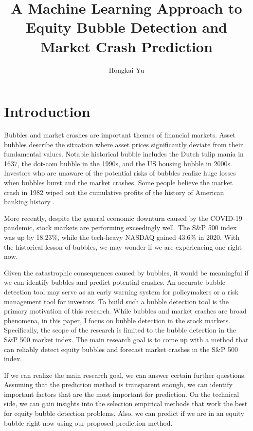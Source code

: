 \documentclass[12pt, man, a4paper, floatsintext]{apa7}
\title{A Machine Learning Approach to Equity Bubble Detection and Market Crash Prediction}
\author{Hongkai Yu}
\affiliation{Vancouver School of Economics, University of British Columbia
          \\ ECON 490
          \\ Dr. Jonathan Graves
          \\ April 23, 2021}
\begin{document}
    \linespread{1} %

    \maketitle

    \section{Introduction}

Bubbles and market crashes are important themes of financial markets. Asset bubbles describe the situation where asset prices significantly deviate from their fundamental values. Notable historical bubble includes the Dutch tulip mania in 1637, the dot-com bubble in the 1990s, and the US housing bubble in 2000s. Investors who are unaware of the potential risks of bubbles realize huge losses when bubbles burst and the market crashes. Some people believe the market crash in 1982 wiped out the cumulative profits of the history of American banking history \parencite{blackswan}.

More recently, despite the general economic downturn caused by the COVID-19 pandemic, stock markets are performing exceedingly well. The S\&P 500 index was up by 18.23\%, while the tech-heavy NASDAQ gained 43.6\% in 2020. With the historical lesson of bubbles, we may wonder if we are experiencing one right now.

Given the catastrophic consequences caused by bubbles, it would be meaningful if we can identify bubbles and predict potential crashes. An accurate bubble detection tool may serve as an early warning system for policymakers or a risk management tool for investors. To build such a bubble detection tool is the primary motivation of this research. While bubbles and market crashes are broad phenomena, in this paper, I focus on bubble detection in the stock markets. Specifically, the scope of the research is limited to the bubble detection in the S\&P 500 market index. The main research goal is to come up with a method that can reliably detect equity bubbles and forecast market crashes in the S\&P 500 index. 

If we can realize the main research goal, we can answer certain further questions. Assuming that the prediction method is transparent enough, we can identify important factors that are the most important for prediction. On the technical side, we can gain insights into the selection empirical methods that work the best for equity bubble detection problems. Also, we can predict if we are in an equity bubble right now using our proposed prediction method. 
\end{document}
